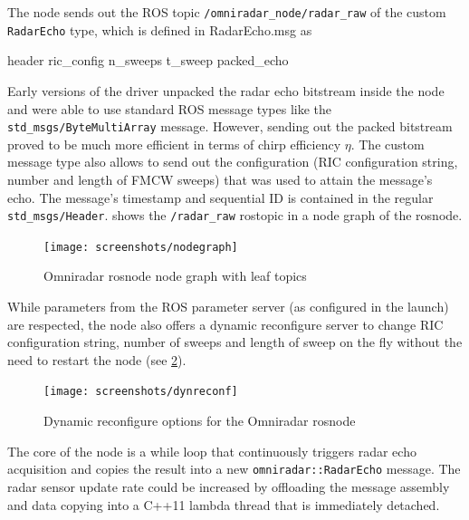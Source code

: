 The node sends out the ROS topic \texttt{/omniradar\_node/radar\_raw} of
the custom \texttt{RadarEcho} type, which is defined in RadarEcho.msg as

\begin{Shaded}
\begin{Highlighting}[]
 header
 ric_config
 n_sweeps
 t_sweep
 packed_echo
\end{Highlighting}
\end{Shaded}


Early versions of the driver unpacked the radar echo bitstream inside
the node and were able to use standard ROS message types like the
\texttt{std\_msgs/ByteMultiArray} message. However, sending out the
packed bitstream proved to be much more efficient in terms of chirp
efficiency \(\eta\). The custom message type also allows to send out the
configuration (RIC configuration string, number and length of FMCW
sweeps) that was used to attain the message's echo. The message's
timestamp and sequential ID is contained in the regular
\texttt{std\_msgs/Header}.  shows the \texttt{/radar\_raw} rostopic in a node graph of the rosnode.

\begin{figure}[htbp]
    \centering
    \texttt{[image: screenshots/nodegraph]}
    \caption{Omniradar rosnode node graph with leaf topics}
    \label{fig:nodegraph}
\end{figure}

While parameters from the ROS parameter server (as configured in the
launch) are respected, the node also offers a dynamic reconfigure server
to change RIC configuration string, number of sweeps and length of sweep
on the fly without the need to restart the node (see \cref{fig:dynreconf}).

\begin{figure}[htbp]
    \centering
    \texttt{[image: screenshots/dynreconf]}
    \caption{Dynamic reconfigure options for the Omniradar rosnode}
    \label{fig:dynreconf}
\end{figure}

The core of the node is a while loop that continuously triggers radar
echo acquisition and copies the result into a new
\texttt{omniradar::RadarEcho} message. The radar sensor update rate
could be increased by offloading the message assembly and data copying
into a C++11 lambda thread that is immediately detached.

